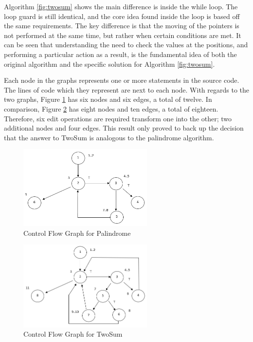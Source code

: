 \documentclass[10pt,twocolumn,hidelinks]{IEEEtran}
\begin{document}
Algorithm \ref{fig:twosum} shows the main difference is inside the while loop. The loop guard is still identical, and the core idea found inside the loop is based off the same requirements. The key difference is that the moving of the pointers is not performed at the same time, but rather when certain conditions are met. It can be seen that understanding the need to check the values at the positions, and performing a particular action as a result, is the fundamental idea of both the original algorithm and the specific solution for Algorithm \ref{fig:twosum}. 
 \par Each node in the graphs represents one or more statements in the source code. The lines of code which they represent are next to each node. With regards to the two graphs, Figure \ref{fig:cfgpal} has six nodes and six edges, a total of twelve. In comparison, Figure \ref{fig:cfgtwosum} has eight nodes and ten edges, a total of eighteen. Therefore, six edit operations are required transform one into the other; two additional nodes and four edges. This result only proved to back up the decision that the answer to TwoSum is analogous to the palindrome algorithm.
 \begin{figure}[h]
\includegraphics[width=0.6\textwidth]{CFGPalindrome.png}
\caption{Control Flow Graph for Palindrome}
\label{fig:cfgpal}
\end{figure}
 \begin{figure}[h]
\includegraphics[width=0.6\textwidth]{CFGTwoSum.png}
\caption{Control Flow Graph for TwoSum}
\label{fig:cfgtwosum}
\end{figure}
\end{document}
